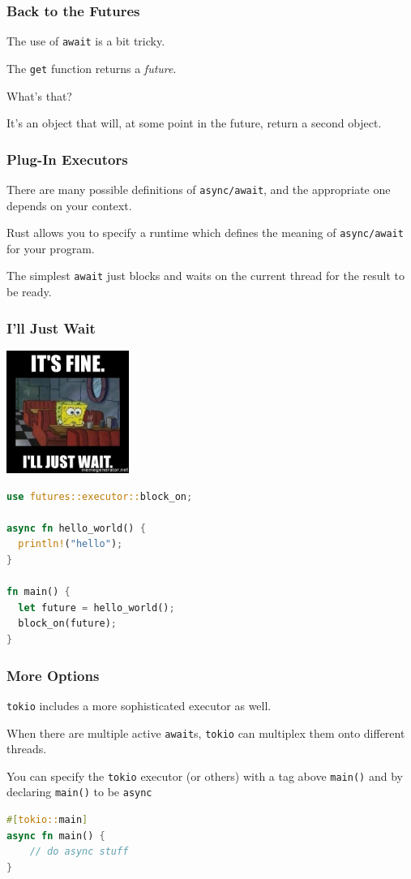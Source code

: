 \begin{frame}
\frametitle{Back to the Futures}

The use of \texttt{await} is a bit tricky.

The \texttt{get} function returns a \emph{future}. 

What's that?  

It's
an object that will, at some point in the future, return a second
object.

\end{frame}


\begin{frame}
\frametitle{Plug-In Executors}

There are many possible definitions of \texttt{async/await}, and the appropriate one depends on your context. 

Rust allows you to specify a runtime
which defines the meaning of \texttt{async/await} for your program.

The simplest \texttt{await} just blocks and waits on the current
thread for the result to be ready. 

\end{frame}


\begin{frame}[fragile]
\frametitle{I'll Just Wait}
\begin{center}
	\includegraphics[width=0.3\textwidth]{images/ill-just-wait.jpg}
\end{center}


\begin{lstlisting}[language=Rust]
use futures::executor::block_on;

async fn hello_world() {
  println!("hello");
}

fn main() {
  let future = hello_world();
  block_on(future);
}
\end{lstlisting}

\end{frame}

\begin{frame}[fragile]
\frametitle{More Options}

\texttt{tokio} includes a more sophisticated executor as well. 

When there are multiple active \texttt{await}s, \texttt{tokio} can multiplex them onto different threads. 

You can specify the \texttt{tokio} executor (or others) with a
tag above {\tt main()} and by declaring \texttt{main()} to be \texttt{async}

\begin{lstlisting}[language=Rust]
#[tokio::main]
async fn main() {
    // do async stuff
}
\end{lstlisting}

\end{frame}

